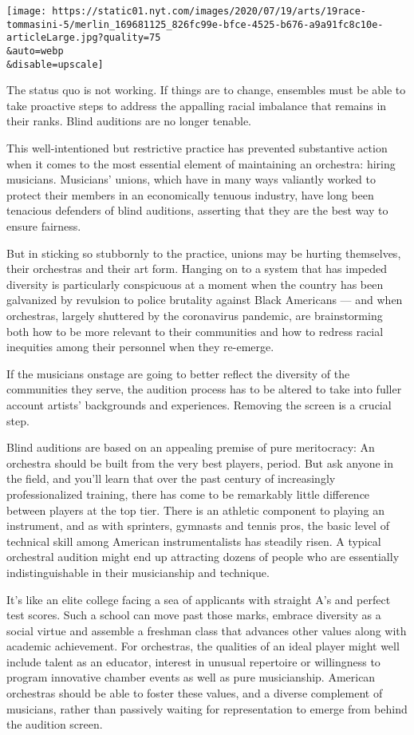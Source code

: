 \texttt{[image: https://static01.nyt.com/images/2020/07/19/arts/19race-tommasini-5/merlin\_169681125\_826fc99e-bfce-4525-b676-a9a91fc8c10e-articleLarge.jpg?quality=75\\\&auto=webp\\\&disable=upscale]}

The status quo is not working. If things are to change, ensembles must
be able to take proactive steps to address the appalling racial
imbalance that remains in their ranks. Blind auditions are no longer
tenable.

This well-intentioned but restrictive practice has prevented substantive
action when it comes to the most essential element of maintaining an
orchestra: hiring musicians. Musicians' unions, which have in many ways
valiantly worked to protect their members in an economically tenuous
industry, have long been tenacious defenders of blind auditions,
asserting that they are the best way to ensure fairness.

But in sticking so stubbornly to the practice, unions may be hurting
themselves, their orchestras and their art form. Hanging on to a system
that has impeded diversity is particularly conspicuous at a moment when
the country has been galvanized by revulsion to police brutality against
Black Americans --- and when orchestras, largely shuttered by the
coronavirus pandemic, are brainstorming both how to be more relevant to
their communities and how to redress racial inequities among their
personnel when they re-emerge.

If the musicians onstage are going to better reflect the diversity of
the communities they serve, the audition process has to be altered to
take into fuller account artists' backgrounds and experiences. Removing
the screen is a crucial step.

Blind auditions are based on an appealing premise of pure meritocracy:
An orchestra should be built from the very best players, period. But ask
anyone in the field, and you'll learn that over the past century of
increasingly professionalized training, there has come to be remarkably
little difference between players at the top tier. There is an athletic
component to playing an instrument, and as with sprinters, gymnasts and
tennis pros, the basic level of technical skill among American
instrumentalists has steadily risen. A typical orchestral audition might
end up attracting dozens of people who are essentially indistinguishable
in their musicianship and technique.

It's like an elite college facing a sea of applicants with straight A's
and perfect test scores. Such a school can move past those marks,
embrace diversity as a social virtue and assemble a freshman class that
advances other values along with academic achievement. For orchestras,
the qualities of an ideal player might well include talent as an
educator, interest in unusual repertoire or willingness to program
innovative chamber events as well as pure musicianship. American
orchestras should be able to foster these values, and a diverse
complement of musicians, rather than passively waiting for
representation to emerge from behind the audition screen.

